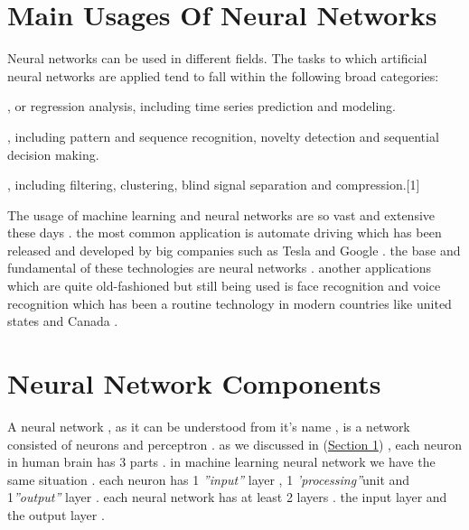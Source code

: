 \documentclass[12pt , a4paper]{article}
\begin{document}
\newpage



\section{Main Usages Of Neural Networks } 
Neural networks can be used in different fields. The tasks to which artificial neural networks are applied tend to fall within the following broad categories: \\
\begin{description}[font=$\bullet$~\normalfont\scshape\color{red!50!black}]
\item [ Function approximation], or regression analysis, including time series prediction and modeling.
\item [Classification] , including pattern and sequence recognition, novelty detection and sequential decision making.
\item [Data processing], including filtering, clustering, blind signal separation and compression.[1]

\end{description}
The usage of machine learning and neural networks are so vast and extensive these days . the most common application is automate driving which has been released and developed by big companies such as Tesla and Google . the base and fundamental of these technologies are neural networks . another applications which are quite old-fashioned but still being used is face recognition and voice recognition which has been a routine technology in modern countries like united states and Canada . \\

\section{ Neural Network Components }
A neural network , as it can be understood from it’s name , is a network consisted of neurons and perceptron . as we discussed in  (\hyperref [sec:1]{Section 1}) , each neuron in human brain has 3 parts . in machine learning neural network we have the same situation . each neuron has 1 \textit{''input''} layer , 1 \textit{'processing''}unit and 1\textit{''output''} layer . each neural network has at least 2 layers . the input layer and the output layer . 
\end{document}
